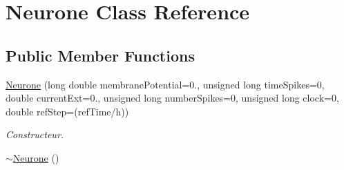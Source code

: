 \hypertarget{classNeurone}{\section{Neurone Class Reference}
\label{classNeurone}
}
\subsection*{Public Member Functions}
\begin{DoxyCompactItemize}
\item 
\hyperlink{classNeurone_a999815ab5fb1d2c753533c6639ea931b}{Neurone} (long double membrane\-Potential=0., unsigned long time\-Spikes=0, double current\-Ext=0., unsigned long number\-Spikes=0, unsigned long clock=0, double ref\-Step=(ref\-Time/h))
\begin{DoxyCompactList}\small\item\em Constructeur. \end{DoxyCompactList}\item 
\hypertarget{classNeurone_aeb6fa39da618a5e19cc91911630fbdc1}{\hyperlink{classNeurone_aeb6fa39da618a5e19cc91911630fbdc1}{$\sim$\-Neurone} ()}\label{classNeurone_aeb6fa39da618a5e19cc91911630fbdc1}


\end{DoxyCompactItemize}
